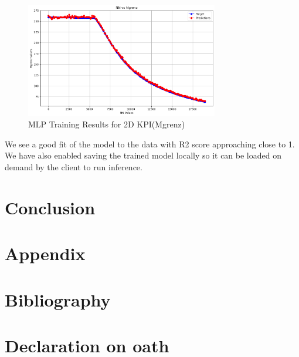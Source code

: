 \documentclass{report} %
\begin{document}
\begin{figure}[h]
    \centering
    \includegraphics[width=0.75\textwidth]{./ReportImages/mlp_kpi2d_prediction.png} 
    \caption{MLP Training Results for 2D KPI(Mgrenz)} 
    \label{fig:MLP Training Results for 2D KPI(Mgrenz)}
\end{figure}

We see a good fit of the model to the data with R2 score approaching close to 1.
We have also enabled saving the trained model locally so it can be loaded on demand by the client to run inference.
\newpage 

\chapter*{Conclusion}

\newpage 

\newpage 

\listoffigures

\newpage 

\newpage 

\listoftables

\newpage 

\newpage 

\chapter*{Appendix}

\newpage 

\newpage 

\chapter*{Bibliography}
\newpage 

\newpage 

\chapter*{Declaration on oath}
\end{document}
